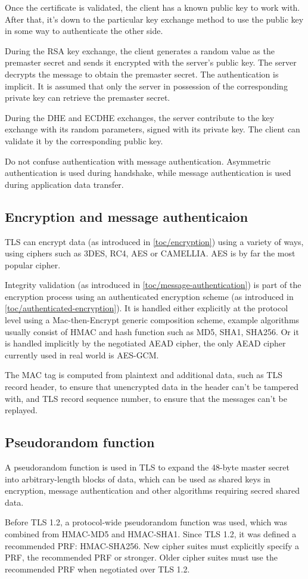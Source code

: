 Once the certificate is validated, the client has a known public key to work with. After that, it's down to the particular key exchange method to use the public key in some way to authenticate the other side.

During the RSA key exchange, the client generates a random value as the premaster secret and sends it encrypted with the server's public key. The server decrypts the message to obtain the premaster secret. The authentication is implicit. It is assumed that only the server in possession of the corresponding private key can retrieve the premaster secret.

During the DHE and ECDHE exchanges, the server contribute to the key exchange with its random parameters, signed with its private key. The client can validate it by the corresponding public key.

Do not confuse authentication with message authentication. Asymmetric authentication is used during handshake, while message authentication is used during application data transfer.

\subsection{Encryption and message authenticaion}

TLS can encrypt data (as introduced in \autoref{toc/encryption}) using a variety of ways, using ciphers such as 3DES, RC4, AES or CAMELLIA. AES is by far the most popular cipher.

Integrity validation (as introduced in \autoref{toc/message-authentication}) is part of the encryption process using an authenticated encryption scheme (as introduced in \autoref{toc/authenticated-encryption}). It is handled either explicitly at the protocol level using a Mac-then-Encrypt generic composition scheme, example algorithms usually consist of HMAC and hash function such as MD5, SHA1, SHA256. Or it is handled implicitly by the negotiated AEAD cipher, the only AEAD cipher currently used in real world is AES-GCM.

The MAC tag is computed from plaintext and additional data, such as TLS record header, to ensure that unencrypted data in the header can't be tampered with, and TLS record sequence number, to ensure that the messages can't be replayed.

\subsection{Pseudorandom function}

A pseudorandom function is used in TLS to expand the 48-byte master secret into arbitrary-length blocks of data, which can be used as shared keys in encryption, message authentication and other algorithms requiring secred shared data.

Before TLS 1.2, a protocol-wide pseudorandom function was used, which was combined from HMAC-MD5 and HMAC-SHA1. Since TLS 1.2, it was defined a recommended PRF: HMAC-SHA256. New cipher suites must explicitly specify a PRF, the recommended PRF or stronger. Older cipher suites must use the recommended PRF when negotiated over TLS 1.2.
